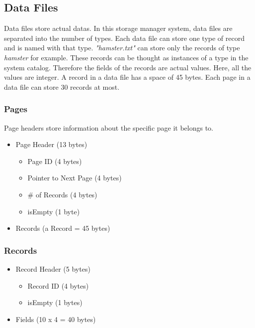 \documentclass[12pt,a4paper]{article}
\begin{document}
    \subsection{Data Files}
        Data files store actual datas. In this storage manager system, data files are separated into the number of types. Each data file can store one type of record and is named with that type. \emph{"hamster.txt"} can store only the records of type \emph{hamster} for example. These records can be thought as instances of a type in the system catalog. Therefore the fields of the records are actual values. Here, all the values are integer. A record in a data file has a space of 45 bytes. Each page in a data file can store 30 records at most.
        \subsubsection{Pages}
            Page headers store information about the specific page it belongs to.
            \begin{itemize}
              \item Page Header (13 bytes)
                \begin{itemize}
                     \item Page ID (4 bytes)
                    \item Pointer to Next Page (4 bytes)
                     \item \# of Records (4 bytes)
                     \item isEmpty (1 byte)
                \end{itemize}
              \item Records (a Record = 45 bytes)
            \end{itemize}
        \subsubsection{Records}
            \begin{itemize}
              \item Record Header (5 bytes)
                \begin{itemize}
                     \item Record ID (4 bytes)
                    \item isEmpty (1 bytes)
                \end{itemize}
              \item Fields (10 x 4 = 40 bytes)
            \end{itemize}
\end{document}
